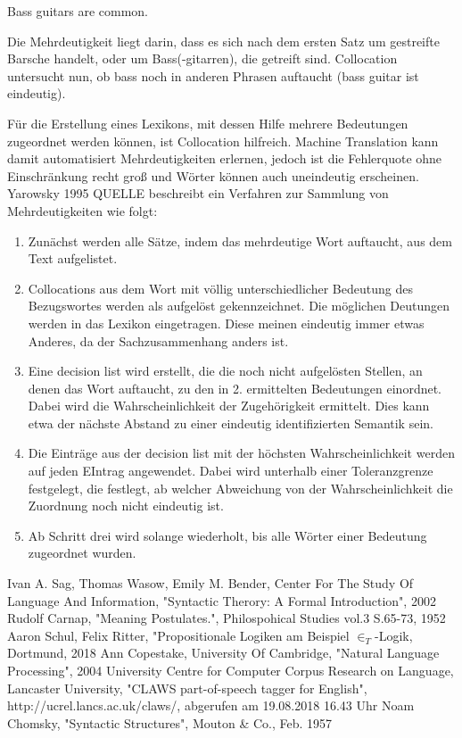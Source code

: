 \documentclass[12pt]{paper}
\begin{document}
Bass guitars are common.
\rm

Die Mehrdeutigkeit liegt darin, dass es sich nach dem ersten Satz um gestreifte Barsche handelt, oder um Bass(-gitarren), die getreift sind. Collocation untersucht nun, ob bass noch in anderen Phrasen auftaucht (bass guitar ist eindeutig).

Für die Erstellung eines Lexikons, mit dessen Hilfe mehrere Bedeutungen zugeordnet werden können, ist Collocation hilfreich. Machine Translation kann damit automatisiert Mehrdeutigkeiten erlernen, jedoch ist die Fehlerquote ohne Einschränkung recht groß und Wörter können auch uneindeutig erscheinen. Yarowsky 1995 QUELLE beschreibt ein Verfahren zur Sammlung von Mehrdeutigkeiten wie folgt: 

\begin{enumerate}
\item Zunächst werden alle Sätze, indem das mehrdeutige Wort auftaucht, aus dem Text aufgelistet.
\item Collocations aus dem Wort mit völlig unterschiedlicher Bedeutung des Bezugswortes werden als aufgelöst gekennzeichnet. Die möglichen Deutungen werden in das Lexikon eingetragen. Diese meinen eindeutig immer etwas Anderes, da der Sachzusammenhang anders ist.
\item Eine decision list wird erstellt, die die noch nicht aufgelösten Stellen, an denen das Wort auftaucht, zu den in 2. ermittelten Bedeutungen einordnet. Dabei wird die Wahrscheinlichkeit der Zugehörigkeit ermittelt. Dies kann etwa der nächste Abstand zu einer eindeutig identifizierten Semantik sein.
\item Die Einträge aus der decision list mit der höchsten Wahrscheinlichkeit werden auf jeden EIntrag angewendet. Dabei wird unterhalb einer Toleranzgrenze festgelegt, die festlegt, ab welcher Abweichung von der Wahrscheinlichkeit die Zuordnung noch nicht eindeutig ist. 
\item Ab Schritt drei wird solange wiederholt, bis alle Wörter einer Bedeutung zugeordnet wurden.
\end{enumerate} 
\newpage

\begin{thebibliography}{5}
Ivan A. Sag, Thomas Wasow, Emily M. Bender, Center For The Study Of Language And Information, "Syntactic Therory: A Formal Introduction", 2002
Rudolf Carnap, "Meaning Postulates.", Philospohical Studies vol.3 S.65-73, 1952
Aaron Schul, Felix Ritter, "Propositionale Logiken am Beispiel $\in_T$-Logik, Dortmund, 2018
Ann Copestake, University Of Cambridge, "Natural Language Processing", 2004
University Centre for Computer Corpus Research on Language, Lancaster University, "CLAWS part-of-speech tagger for English", http://ucrel.lancs.ac.uk/claws/, abgerufen am 19.08.2018 16.43 Uhr
 Noam Chomsky, "Syntactic Structures", Mouton \& Co., Feb. 1957

\end{thebibliography}
\end{document}
